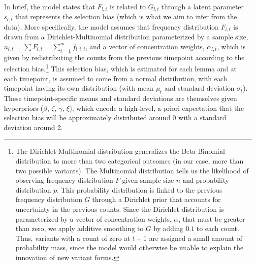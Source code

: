 \documentclass[doc,biblatex]{apa7}
\begin{document}
In brief, the model states that $F_{l,t}$ is related to $G_{l,t}$ through a latent parameter $s_{l,t}$ that represents the selection bias (which is what we aim to infer from the data). More specifically, the model assumes that frequency distribution $F_{l,t}$ is drawn from a Dirichlet-Multinomial distribution parameterized by a sample size, $n_{l,t} = \sum F_{l,t} = \sum_{i=1}^m f_{l,t,i}$, and a vector of concentration weights, $\alpha_{l,t}$, which is given by redistributing the counts from the previous timepoint according to the selection bias.\footnote{The Dirichlet-Multinomial distribution generalizes the Beta-Binomial distribution to more than two categorical outcomes (in our case, more than two possible variants). The Multinomial distribution tells us the likelihood of observing frequency distribution $F$ given sample size $n$ and probability distribution $p$. This probability distribution is linked to the previous frequency distribution $G$ through a Dirichlet prior that accounts for uncertainty in the previous counts. Since the Dirichlet distribution is parameterized by a vector of concentration weights, $\alpha$, that must be greater than zero, we apply additive smoothing to $G$ by adding $0.1$ to each count. Thus, variants with a count of zero at $t-1$ are assigned a small amount of probability mass, since the model would otherwise be unable to explain the innovation of new variant forms.} This selection bias, which is estimated for each lemma and at each timepoint, is assumed to come from a normal distribution, with each timepoint having its own distribution (with mean $\mu_t$ and standard deviation $\sigma_t$). These timepoint-specific means and standard deviations are themselves given hyperpriors ($\beta$, $\zeta$, $\gamma$, $\xi$), which encode a high-level, a-priori expectation that the selection bias will be approximately distributed around 0 with a standard deviation around 2.
\end{document}

